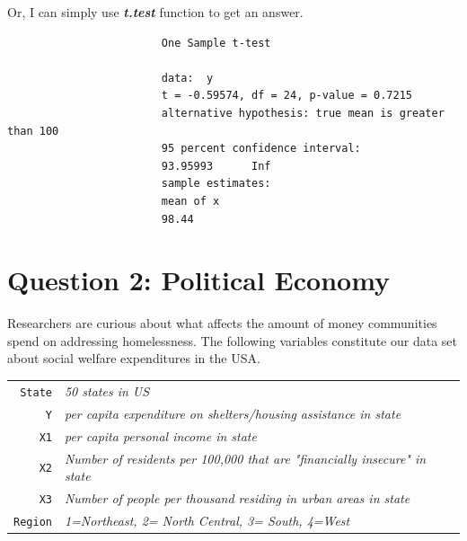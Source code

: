 \documentclass[12pt,letterpaper]{article}
\begin{document}
\begin{enumerate}
					\noindent Or, I can simply use \textbf{\textit{t.test}} function to get an answer.
				
						
					\begin{verbatim}
						One Sample t-test
						
						data:  y
						t = -0.59574, df = 24, p-value = 0.7215
						alternative hypothesis: true mean is greater than 100
						95 percent confidence interval:
						93.95993      Inf
						sample estimates:
						mean of x 
						98.44 
					\end{verbatim}
					
				\end{enumerate}

\section*{Question 2: Political Economy}

	\noindent Researchers are curious about what affects the amount of money communities spend on addressing homelessness. The following variables constitute our data set about social welfare expenditures in the USA. \\
	\vspace{.5cm}
	
	
	\begin{tabular}{r|l}
		\texttt{State} &\emph{50 states in US} \\
		\texttt{Y} & \emph{per capita expenditure on shelters/housing assistance in state}\\
		\texttt{X1} &\emph{per capita personal income in state} \\
		\texttt{X2} &  \emph{Number of residents per 100,000 that are "financially insecure" in state}\\
		\texttt{X3} &  \emph{Number of people per thousand residing in urban areas in state} \\
		\texttt{Region} &  \emph{1=Northeast, 2= North Central, 3= South, 4=West} \\
	\end{tabular}
	
\end{document}
